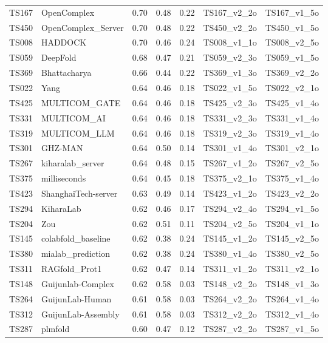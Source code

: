 \begin{table}[ht]
{\begin{tabular}{llrrrll}
TS167 & OpenComplex & 0.70 & 0.48 & 0.22 & TS167\_v2\_2o & TS167\_v1\_5o \\ 
TS450 & OpenComplex\_Server & 0.70 & 0.48 & 0.22 & TS450\_v2\_2o & TS450\_v1\_5o \\ 
TS008 & HADDOCK & 0.70 & 0.46 & 0.24 & TS008\_v1\_1o & TS008\_v2\_5o \\ 
TS059 & DeepFold & 0.68 & 0.47 & 0.21 & TS059\_v2\_3o & TS059\_v1\_5o \\ 
TS369 & Bhattacharya & 0.66 & 0.44 & 0.22 & TS369\_v1\_3o & TS369\_v2\_2o \\ 
TS022 & Yang & 0.64 & 0.46 & 0.18 & TS022\_v1\_5o & TS022\_v2\_1o \\ 
TS425 & MULTICOM\_GATE & 0.64 & 0.46 & 0.18 & TS425\_v2\_3o & TS425\_v1\_4o \\ 
TS331 & MULTICOM\_AI & 0.64 & 0.46 & 0.18 & TS331\_v2\_3o & TS331\_v1\_4o \\ 
TS319 & MULTICOM\_LLM & 0.64 & 0.46 & 0.18 & TS319\_v2\_3o & TS319\_v1\_4o \\ 
TS301 & GHZ-MAN & 0.64 & 0.50 & 0.14 & TS301\_v1\_4o & TS301\_v2\_1o \\ 
TS267 & kiharalab\_server & 0.64 & 0.48 & 0.15 & TS267\_v1\_2o & TS267\_v2\_5o \\ 
TS375 & milliseconds & 0.64 & 0.45 & 0.18 & TS375\_v2\_1o & TS375\_v1\_4o \\ 
TS423 & ShanghaiTech-server & 0.63 & 0.49 & 0.14 & TS423\_v1\_2o & TS423\_v2\_2o \\ 
TS294 & KiharaLab & 0.62 & 0.46 & 0.17 & TS294\_v2\_4o & TS294\_v1\_5o \\ 
TS204 & Zou & 0.62 & 0.51 & 0.11 & TS204\_v2\_5o & TS204\_v1\_1o \\ 
TS145 & colabfold\_baseline & 0.62 & 0.38 & 0.24 & TS145\_v1\_2o & TS145\_v2\_5o \\ 
TS380 & mialab\_prediction & 0.62 & 0.38 & 0.24 & TS380\_v1\_4o & TS380\_v2\_5o \\ 
TS311 & RAGfold\_Prot1 & 0.62 & 0.47 & 0.14 & TS311\_v1\_2o & TS311\_v2\_1o \\ 
TS148 & Guijunlab-Complex & 0.62 & 0.58 & 0.03 & TS148\_v2\_2o & TS148\_v1\_3o \\ 
TS264 & GuijunLab-Human & 0.61 & 0.58 & 0.03 & TS264\_v2\_2o & TS264\_v1\_4o \\ 
TS312 & GuijunLab-Assembly & 0.61 & 0.58 & 0.03 & TS312\_v2\_2o & TS312\_v1\_4o \\ 
TS287 & plmfold & 0.60 & 0.47 & 0.12 & TS287\_v2\_2o & TS287\_v1\_5o \\ 

\end{tabular}}
\end{table}
